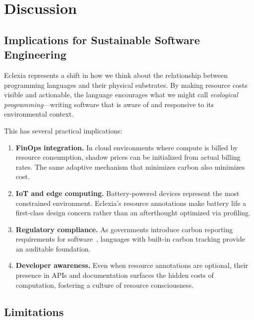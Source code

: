 \documentclass[11pt,a4paper]{article}
\begin{document}
\section{Discussion}
\label{sec:discussion}

\subsection{Implications for Sustainable Software Engineering}

Eclexia represents a shift in how we think about the relationship between
programming languages and their physical substrates.  By making resource costs
visible and actionable, the language encourages what we might call
\emph{ecological programming}---writing software that is aware of and responsive
to its environmental context.

This has several practical implications:

\begin{enumerate}
  \item \textbf{FinOps integration.}  In cloud environments where compute is
    billed by resource consumption, shadow prices can be initialized from actual
    billing rates.  The same adaptive mechanism that minimizes carbon also
    minimizes cost.

  \item \textbf{IoT and edge computing.}  Battery-powered devices represent the
    most constrained environment.  Eclexia's resource annotations make battery
    life a first-class design concern rather than an afterthought optimized via
    profiling.

  \item \textbf{Regulatory compliance.}  As governments introduce carbon
    reporting requirements for software~\cite{eu_csrd}, languages with built-in
    carbon tracking provide an auditable foundation.

  \item \textbf{Developer awareness.}  Even when resource annotations are
    optional, their presence in APIs and documentation surfaces the hidden costs
    of computation, fostering a culture of resource consciousness.
\end{enumerate}

\subsection{Limitations}
\end{document}
